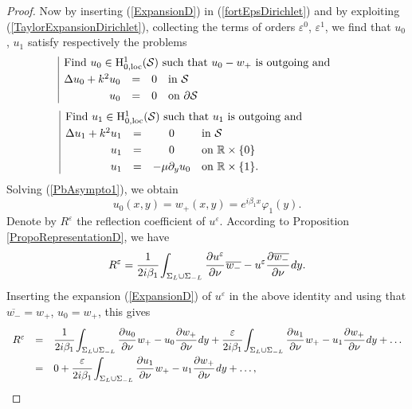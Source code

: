 \documentclass[11pt,a4paper]{report}
\newcommand{\dsp}{\displaystyle}
\newcommand{\eps}{\varepsilon}
\newcommand{\mrm}[1]{\mathrm{#1}}
\newcommand{\R}{\mathbb{R}}
\newcommand{\mH}{\mrm{H}}
\newcommand{\loc}{\mbox{\scriptsize loc}}
\begin{document}
\begin{proof}
Now by inserting (\ref{ExpansionD}) in (\ref{fortEpsDirichlet}) and by exploiting (\ref{TaylorExpansionDirichlet}), collecting the terms of orders $\eps^0$, $\eps^1$, we find that $u_0$, $u_1$ satisfy respectively the problems
\begin{equation}\label{PbAsympto1}
\begin{array}{|rccl}
\multicolumn{4}{|l}{\mbox{Find }u_0\in\mH^1_{0,\loc}(\mathcal{S})\mbox{ such that }u_0-w_+\mbox{ is outgoing and }\hspace{0.4cm}~ }\\[3pt]
\Delta u_0 + k^2u_0 &=& 0&  \mbox{in }\mathcal{S}\\[3pt]
 u_0&=&0 & \mbox{on } \partial\mathcal{S}
\end{array}
\end{equation}
\begin{equation}\label{PbAsympto2}
\begin{array}{|rccl}
\multicolumn{4}{|l}{\mbox{Find }u_1\in\mH^1_{0,\loc}(\mathcal{S})\mbox{ such that }u_1\mbox{ is outgoing and } }\\[3pt]
\Delta u_1 + k^2u_1 &=& 0&  \mbox{in } \mathcal{S}\\[3pt]
 u_1&=&0 & \mbox{on } \R\times\{0\}\\[3pt]
 u_1&=& -\mu\partial_y u_0 & \mbox{on }\R\times\{1\}.
\end{array}\hspace{1.35cm}
\end{equation}
Solving (\ref{PbAsympto1}), we obtain 
\begin{equation}\label{Identifiu0}
u_0(x,y)=w_+(x,y)=e^{i\beta_1x}\varphi_1(y).
\end{equation} 
Denote by $R^\eps$ the reflection coefficient of $u^\eps$. According to Proposition \ref{PropoRepresentationD}, we have 
\[
R^\eps=\cfrac{1}{2i\beta_1}\dsp\int_{\Sigma_{L}\cup \Sigma_{-L}}\cfrac{\partial u^\eps}{\partial \nu}\,\overline{w_-}-u^\eps\cfrac{\partial \overline{w_-}}{\partial \nu}\,dy.
\]
Inserting the expansion (\ref{ExpansionD}) of $u^\eps$ in the above identity and using that $\overline{w_-}=w_+$, $u_0=w_+$, this gives
\[
\begin{array}{rcl}
R^\eps&=&\dsp\cfrac{1}{2i\beta_1}\dsp\int_{\Sigma_{L}\cup \Sigma_{-L}}\cfrac{\partial u_0}{\partial \nu}\,w_+-u_0\cfrac{\partial w_+}{\partial \nu}\,dy+\cfrac{\eps}{2i\beta_1}\dsp\int_{\Sigma_{L}\cup \Sigma_{-L}}\cfrac{\partial u_1}{\partial \nu}\,w_+-u_1\cfrac{\partial w_+}{\partial \nu}\,dy+\dots \\[8pt]
&=& 0+\cfrac{\eps}{2i\beta_1}\dsp\int_{\Sigma_{L}\cup \Sigma_{-L}}\cfrac{\partial u_1}{\partial \nu}\,w_+-u_1\cfrac{\partial w_+}{\partial \nu}\,dy+\dots ,

\end{array}\]
\end{proof}
\end{document}
